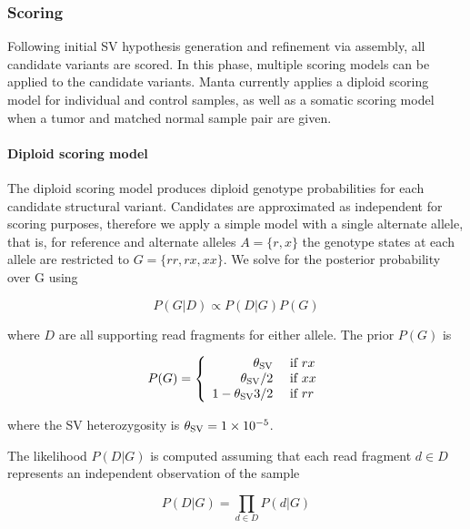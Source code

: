 \documentclass{article}
\newcommand{\e}[1]{\ensuremath{\times 10^{#1}}}
\begin{document}
\subsubsection{Scoring}

Following initial SV hypothesis generation and refinement via assembly, all candidate variants are scored. In this phase, multiple scoring models can be applied to the candidate variants. Manta currently applies a diploid scoring model for individual and control samples, as well as a somatic scoring model when a tumor and matched normal sample pair are given.

\paragraph{Diploid scoring model}

The diploid scoring model produces diploid genotype probabilities for each candidate structural variant. Candidates are approximated as independent for scoring purposes, therefore we apply a simple model with a single alternate allele, that is, for reference and alternate alleles $A = \{r,x\}$ the genotype states at each allele are restricted to $G = \{rr, rx, xx\}$. We solve for the posterior probability over G using

\begin{equation*}
P( G \vert D ) \propto P( D \vert G )  P (G)
\end{equation*}

\noindent
where $D$ are all supporting read fragments for either allele. The prior $P(G)$ is

\newcommand{\thz}{\theta_{\textnormal{SV}}}

\begin{equation*}
P ( G ) =
\left\{
\begin{array}{rl}
\thz      & \mbox{ if $rx$} \\
\thz / 2  & \mbox{ if $xx$} \\
1 - \thz 3 / 2  & \mbox{ if $rr$}
\end{array}
\right.
\end{equation*}

\noindent
where the SV heterozygosity is $\thz = 1\e{-5}$.

The likelihood $P(D \vert G)$ is computed assuming that each read fragment $d \in D$ represents an independent observation of the sample

\begin{equation*}
P(D \vert G) = \prod_{d \in D} P(d \vert G)
\end{equation*}
\end{document}
